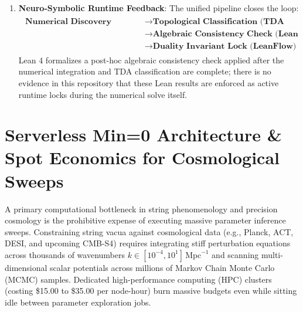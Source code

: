 \documentclass[11pt,a4paper]{article}
\begin{document}
\begin{enumerate}
    \item \textbf{Neuro-Symbolic Runtime Feedback}: The unified pipeline closes the loop:
    \begin{align}
    \begin{split}
    \textbf{Numerical Discovery (LeanFlow)} &\longrightarrow \textbf{Topological Classification (TDA Mapper)} \\
    &\longrightarrow \textbf{Algebraic Consistency Check (Lean 4)} \\
    &\longrightarrow \textbf{Duality Invariant Lock (LeanFlow)}
    \end{split}
    \end{align}
    Lean 4 formalizes a post-hoc algebraic consistency check applied after the numerical integration and TDA classification are complete; there is no evidence in this repository that these Lean results are enforced as active runtime locks during the numerical solve itself.
\end{enumerate}

\section{Serverless Min=0 Architecture \& Spot Economics for Cosmological Sweeps}
A primary computational bottleneck in string phenomenology and precision cosmology is the prohibitive expense of executing massive parameter inference sweeps. Constraining string vacua against cosmological data (e.g., Planck, ACT, DESI, and upcoming CMB-S4) requires integrating stiff perturbation equations across thousands of wavenumbers $k \in [10^{-4}, 10^1]\,\text{Mpc}^{-1}$ and scanning multi-dimensional scalar potentials across millions of Markov Chain Monte Carlo (MCMC) samples. Dedicated high-performance computing (HPC) clusters (costing \$15.00 to \$35.00 per node-hour) burn massive budgets even while sitting idle between parameter exploration jobs.
\end{document}
